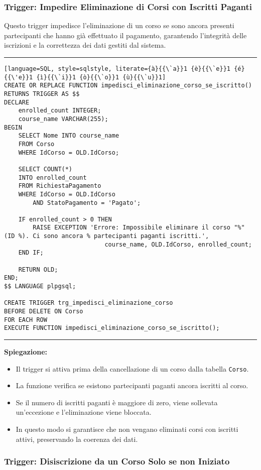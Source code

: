 \subsubsection{Trigger: Impedire Eliminazione di Corsi con Iscritti Paganti}

Questo trigger impedisce l'eliminazione di un corso se sono ancora presenti partecipanti che hanno già effettuato il pagamento, garantendo l'integrità delle iscrizioni e la correttezza dei dati gestiti dal sistema.

\noindent\rule{\textwidth}{0.4pt}
\begin{lstlisting}[language=SQL, style=sqlstyle, literate={à}{{\`a}}1 {è}{{\`e}}1 {é}{{\'e}}1 {ì}{{\`i}}1 {ò}{{\`o}}1 {ù}{{\`u}}1]
CREATE OR REPLACE FUNCTION impedisci_eliminazione_corso_se_iscritto()
RETURNS TRIGGER AS $$
DECLARE
    enrolled_count INTEGER;
    course_name VARCHAR(255);
BEGIN
    SELECT Nome INTO course_name
    FROM Corso
    WHERE IdCorso = OLD.IdCorso;

    SELECT COUNT(*)
    INTO enrolled_count
    FROM RichiestaPagamento
    WHERE IdCorso = OLD.IdCorso
        AND StatoPagamento = 'Pagato';

    IF enrolled_count > 0 THEN
        RAISE EXCEPTION 'Errore: Impossibile eliminare il corso "%" (ID %). Ci sono ancora % partecipanti paganti iscritti.',
                            course_name, OLD.IdCorso, enrolled_count;
    END IF;

    RETURN OLD;
END;
$$ LANGUAGE plpgsql;

CREATE TRIGGER trg_impedisci_eliminazione_corso
BEFORE DELETE ON Corso
FOR EACH ROW
EXECUTE FUNCTION impedisci_eliminazione_corso_se_iscritto();
\end{lstlisting}
\noindent\rule{\textwidth}{0.4pt}

\textbf{Spiegazione:}
\begin{itemize}
    \item Il trigger si attiva prima della cancellazione di un corso dalla tabella \texttt{Corso}.
    \item La funzione verifica se esistono partecipanti paganti ancora iscritti al corso.
    \item Se il numero di iscritti paganti è maggiore di zero, viene sollevata un'eccezione e l'eliminazione viene bloccata.
    \item In questo modo si garantisce che non vengano eliminati corsi con iscritti attivi, preservando la coerenza dei dati.
\end{itemize}
\subsubsection{Trigger: Disiscrizione da un Corso Solo se non Iniziato}

